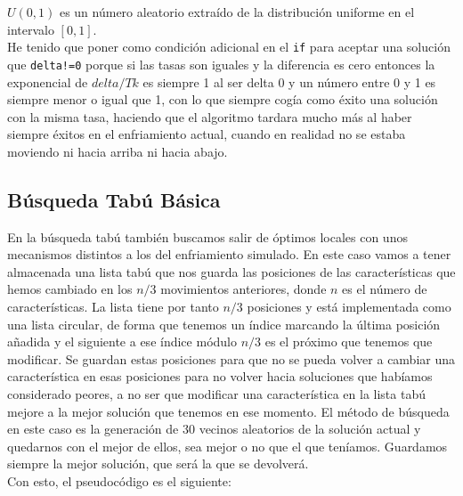 \documentclass[12pt]{article}
\begin{document}
$U(0,1)$ es un número aleatorio extraído de la distribución uniforme en el intervalo $[0,1]$.\\

He tenido que poner como condición adicional en el \texttt{if} para aceptar una solución que \texttt{delta!=0} porque si las tasas son iguales y la diferencia es cero entonces la exponencial de $delta/Tk$ es siempre 1 al ser delta 0 y un número entre 0 y 1 es siempre menor o igual que 1, con lo que siempre cogía como éxito una solución con la misma tasa, haciendo que el algoritmo tardara mucho más al haber siempre éxitos en el enfriamiento actual, cuando en realidad no se estaba moviendo ni hacia arriba ni hacia abajo.

\subsection{Búsqueda Tabú Básica}
En la búsqueda tabú también buscamos salir de óptimos locales con unos mecanismos distintos a los del enfriamiento simulado. En este caso vamos a tener almacenada una lista tabú que nos guarda las posiciones de las características que hemos cambiado en los $n/3$ movimientos anteriores, donde $n$ es el número de características.  La lista tiene por tanto $n/3$ posiciones y está implementada como una lista circular, de forma que tenemos un índice marcando la última posición añadida y el siguiente a ese índice módulo $n/3$ es el próximo que tenemos que modificar. Se guardan estas posiciones para que no se pueda volver a cambiar una característica en esas posiciones para no volver hacia soluciones que habíamos considerado peores, a no ser que modificar una característica en la lista tabú mejore a la mejor solución que tenemos en ese momento. El método de búsqueda en este caso es la generación de 30 vecinos aleatorios de la solución actual y quedarnos con el mejor de ellos, sea mejor o no que el que teníamos. Guardamos siempre la mejor solución, que será la que se devolverá.\\
Con esto, el pseudocódigo es el siguiente:
\end{document}
